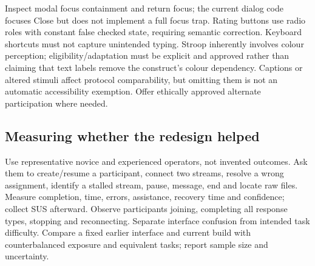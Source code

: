 \documentclass[11pt,a4paper]{article}
\begin{document}
Inspect modal focus containment and return focus; the current dialog code focuses Close but does not implement a full focus trap. Rating buttons use radio roles with constant false checked state, requiring semantic correction. Keyboard shortcuts must not capture unintended typing. Stroop inherently involves colour perception; eligibility/adaptation must be explicit and approved rather than claiming that text labels remove the construct's colour dependency. Captions or altered stimuli affect protocol comparability, but omitting them is not an automatic accessibility exemption. Offer ethically approved alternate participation where needed.

\subsection{Measuring whether the redesign helped}
Use representative novice and experienced operators, not invented outcomes. Ask them to create/resume a participant, connect two streams, resolve a wrong assignment, identify a stalled stream, pause, message, end and locate raw files. Measure completion, time, errors, assistance, recovery time and confidence; collect SUS afterward. Observe participants joining, completing all response types, stopping and reconnecting. Separate interface confusion from intended task difficulty. Compare a fixed earlier interface and current build with counterbalanced exposure and equivalent tasks; report sample size and uncertainty.
\end{document}
